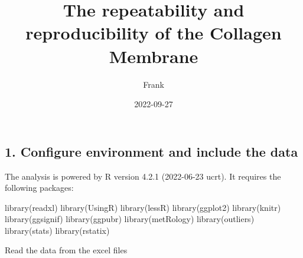 \documentclass[
]{article}
\title{The repeatability and reproducibility of the Collagen Membrane}
\author{Frank}
\date{2022-09-27}
\newenvironment{Shaded}{\begin{snugshade}}{\end{snugshade}}
\newcommand{\FunctionTok}[1]{\textcolor[rgb]{0.00,0.00,0.00}{#1}}
\newcommand{\NormalTok}[1]{#1}
\begin{document}
\maketitle

\hypertarget{configure-environment-and-include-the-data}{%
\subsection{1. Configure environment and include the
data}\label{configure-environment-and-include-the-data}}

The analysis is powered by R version 4.2.1 (2022-06-23 ucrt). It
requires the following packages:

\begin{Shaded}
\begin{Highlighting}[]
\FunctionTok{library}\NormalTok{(readxl)}
\FunctionTok{library}\NormalTok{(UsingR)}
\FunctionTok{library}\NormalTok{(lessR)}
\FunctionTok{library}\NormalTok{(ggplot2)}
\FunctionTok{library}\NormalTok{(knitr)}
\FunctionTok{library}\NormalTok{(ggsignif)}
\FunctionTok{library}\NormalTok{(ggpubr)}
\FunctionTok{library}\NormalTok{(metRology)}
\FunctionTok{library}\NormalTok{(outliers)}
\FunctionTok{library}\NormalTok{(stats)}
\FunctionTok{library}\NormalTok{(rstatix)}
\end{Highlighting}
\end{Shaded}

Read the data from the excel files
\end{document}

